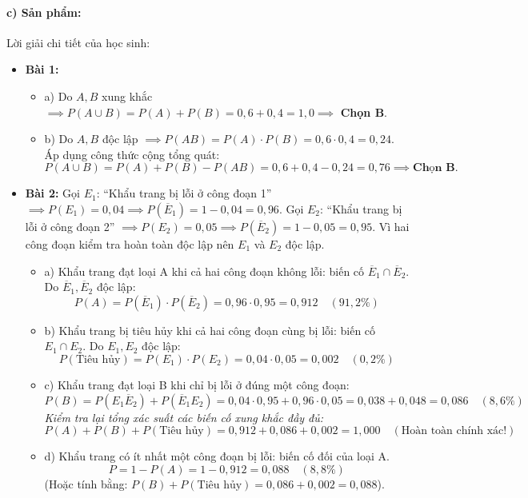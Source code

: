 \documentclass[12pt, a4paper]{article}
\begin{document}
\paragraph{c) Sản phẩm:} Lời giải chi tiết của học sinh:
\begin{itemize}[leftmargin=0.8cm]
    \item \textbf{Bài 1:}
    \begin{itemize}[leftmargin=0.4cm]
        \item a) Do $A, B$ xung khắc $\implies P(A \cup B) = P(A) + P(B) = 0{,}6 + 0{,}4 = 1{,}0 \implies$ \textbf{Chọn B}.
        \item b) Do $A, B$ độc lập $\implies P(AB) = P(A) \cdot P(B) = 0{,}6 \cdot 0{,}4 = 0{,}24$.
        Áp dụng công thức cộng tổng quát:
        $$P(A \cup B) = P(A) + P(B) - P(AB) = 0{,}6 + 0{,}4 - 0{,}24 = 0{,}76 \implies \textbf{Chọn B}.$$
    \end{itemize}
    \item \textbf{Bài 2:}
    Gọi $E_1$: ``Khẩu trang bị lỗi ở công đoạn 1'' $\implies P(E_1) = 0{,}04 \implies P(\overline{E}_1) = 1 - 0{,}04 = 0{,}96$.
    Gọi $E_2$: ``Khẩu trang bị lỗi ở công đoạn 2'' $\implies P(E_2) = 0{,}05 \implies P(\overline{E}_2) = 1 - 0{,}05 = 0{,}95$.
    Vì hai công đoạn kiểm tra hoàn toàn độc lập nên $E_1$ và $E_2$ độc lập.
    \begin{itemize}[leftmargin=0.4cm]
        \item a) Khẩu trang đạt loại A khi cả hai công đoạn không lỗi: biến cố $\overline{E}_1 \cap \overline{E}_2$.
        Do $\overline{E}_1, \overline{E}_2$ độc lập:
        $$P(A) = P(\overline{E}_1) \cdot P(\overline{E}_2) = 0{,}96 \cdot 0{,}95 = 0{,}912 \quad (91{,}2\%)$$
        \item b) Khẩu trang bị tiêu hủy khi cả hai công đoạn cùng bị lỗi: biến cố $E_1 \cap E_2$.
        Do $E_1, E_2$ độc lập:
        $$P(\text{Tiêu hủy}) = P(E_1) \cdot P(E_2) = 0{,}04 \cdot 0{,}05 = 0{,}002 \quad (0{,}2\%)$$
        \item c) Khẩu trang đạt loại B khi chỉ bị lỗi ở đúng một công đoạn:
        $$P(B) = P(E_1 \overline{E}_2) + P(\overline{E}_1 E_2) = 0{,}04 \cdot 0{,}95 + 0{,}96 \cdot 0{,}05 = 0{,}038 + 0{,}048 = 0{,}086 \quad (8{,}6\%)$$
        \textit{Kiểm tra lại tổng xác suất các biến cố xung khắc đầy đủ:}
        $$P(A) + P(B) + P(\text{Tiêu hủy}) = 0{,}912 + 0{,}086 + 0{,}002 = 1{,}000 \quad (\text{Hoàn toàn chính xác!})$$
        \item d) Khẩu trang có ít nhất một công đoạn bị lỗi: biến cố đối của loại A.
        $$P = 1 - P(A) = 1 - 0{,}912 = 0{,}088 \quad (8{,}8\%)$$
        (Hoặc tính bằng: $P(B) + P(\text{Tiêu hủy}) = 0{,}086 + 0{,}002 = 0{,}088$).
    \end{itemize}
\end{itemize}
\end{document}
